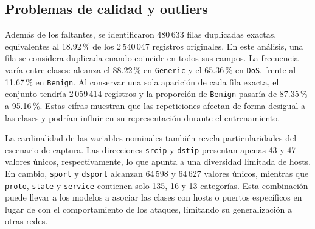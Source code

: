 \documentclass[conference]{IEEEtran}
\begin{document}
\begin{table}[!tb]
\centering
\caption{Estadísticos descriptivos de variables numéricas seleccionadas por grupo funcional.}
\label{tab:descriptivos}
\footnotesize
{}
\end{table}

\subsection{Problemas de calidad y outliers}

Además de los faltantes, se identificaron 480\,633 filas duplicadas exactas, equivalentes al 18.92\,\% de los 2\,540\,047 registros originales. En este análisis, una fila se considera duplicada cuando coincide en todos sus campos. La frecuencia varía entre clases: alcanza el 88.22\,\% en \texttt{Generic} y el 65.36\,\% en \texttt{DoS}, frente al 11.67\,\% en \texttt{Benign}. Al conservar una sola aparición de cada fila exacta, el conjunto tendría 2\,059\,414 registros y la proporción de \texttt{Benign} pasaría de 87.35\,\% a 95.16\,\%. Estas cifras muestran que las repeticiones afectan de forma desigual a las clases y podrían influir en su representación durante el entrenamiento.

La cardinalidad de las variables nominales también revela particularidades del escenario de captura. Las direcciones \texttt{srcip} y \texttt{dstip} presentan apenas 43 y 47 valores únicos, respectivamente, lo que apunta a una diversidad limitada de hosts. En cambio, \texttt{sport} y \texttt{dsport} alcanzan 64\,598 y 64\,627 valores únicos, mientras que \texttt{proto}, \texttt{state} y \texttt{service} contienen solo 135, 16 y 13 categorías. Esta combinación puede llevar a los modelos a asociar las clases con hosts o puertos específicos en lugar de con el comportamiento de los ataques, limitando su generalización a otras redes.
\end{document}
